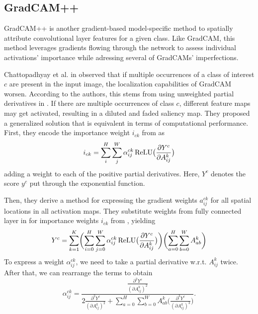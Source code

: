 \subsection{GradCAM++}\label{sub:gradcampp}

GradCAM++ \cite{grad-cam-pp} is another gradient-based model-specific method to spatially attribute convolutional layer features for a given class.
Like GradCAM, this method leverages gradients flowing through the network to assess individual activations' importance while adressing several of GradCAMs' imperfections.

Chattopadhyay et al. in \cite{grad-cam-pp} observed that if multiple occurrences of a class of interest $c$ are present in the input image, the localization capabilities of GradCAM worsen.
According to the authors, this stems from using unweighted partial derivatives in .
If there are multiple occurrences of class $c$, different feature maps may get activated, resulting in a diluted and faded saliency map.
They proposed a generalized solution that is equivalent in terms of computational performance.
First, they encode the importance weight $i_{ck}$ from  as
\begin{equation}\label{eq:grad-cam-pp-weights}
    i_{ck} = \sum_i^H \sum_j^W \alpha^{ck}_{ij} \operatorname{ReLU}\bigl(\frac{\partial Y^c}{\partial A^k_{ij}}\bigr)
\end{equation}
adding a weight to each of the positive partial derivatives.
Here, $Y^c$ denotes the score $y^c$ put through the exponential function.

Then, they derive a method for expressing the gradient weights $a^{ck}_{ij}$ for all spatial locations in all activation maps.
They substitute weights from fully connected layer in  for importance weights $i_{ck}$ from , yielding
\begin{equation}\label{eq:grad-cam-pp-score}
    Y^c = \sum_{k=1}^K \biggl( \sum_{i=0}^H \sum_{j=0}^W \alpha^{ck}_{ij} \operatorname{ReLU} \bigl(\frac{\partial Y^c}{\partial A^k_{ij}}\bigr) \biggr) \biggl( \sum_{a=0}^H \sum_{b=0}^W A^{k}_{ab} \biggr)
\end{equation}
To express a weight $\alpha^{ck}_{ij}$, we need to take a partial derivative w.r.t. $A^k_{ij}$ twice. After that, we can rearrange the terms to obtain
\begin{equation}
    \alpha^{ck}_{ij} = \frac{\frac{\partial^2 Y^c}{(\partial A^k_{ij})^2}}{2\frac{\partial^2 Y^c}{(\partial A^k_{ij})^2} + \sum_{a=0}^H \sum_{b=0}^W A^{k}_{ab} \bigl( \frac{\partial^3 Y^c}{(\partial A^k_{ij})^3} \bigr)}.
\end{equation}

